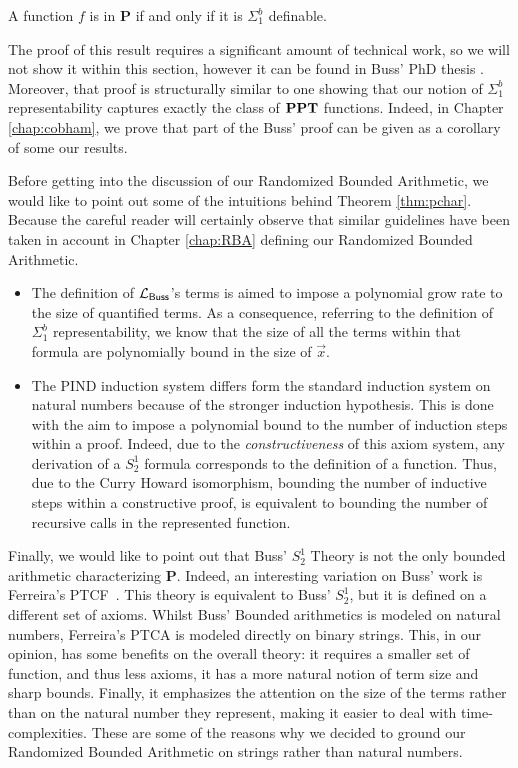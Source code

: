 \begin{theorem}
  \label{thm:pchar}
  A function $f$ is in $\mathbf P$ if and only if it is $\Sigma^b_1$ definable.
\end{theorem}

The proof of this result requires a significant amount of technical work, so we will not show it within this section, however it can be found in Buss' PhD thesis \cite{Buss86}. Moreover, that proof is structurally similar to one showing that our notion of $\Sigma^b_1$ representability captures exactly the class of $\mathbf{PPT}$ functions. Indeed, in Chapter \ref{chap:cobham}, we prove that part of the Buss' proof can be given as a corollary of some our results.

Before getting into the discussion of our Randomized Bounded
Arithmetic, we would like to point out some of the intuitions behind
Theorem \ref{thm:pchar}. Because the careful reader will certainly observe that
similar guidelines have been taken in account in Chapter \ref{chap:RBA} defining
our Randomized Bounded Arithmetic.

\begin{itemize}
  \item The definition of $\mathcal{L}_{\mathsf{Buss}}$'s terms is aimed to impose a polynomial grow rate to the size of quantified terms. As a consequence, referring to the definition of $\Sigma^b_1$ representability, we know that the size of all the terms within that formula are polynomially bound in the size of $\vec x$.
  \item The PIND induction system differs form the standard induction system on natural numbers because of the stronger induction hypothesis. This is done with the aim to impose a polynomial bound to the number of induction steps within a proof.
  Indeed, due to the \emph{constructiveness} of this axiom system,
  any derivation of a $S^1_2$ formula corresponds to
  the definition of a function. Thus, due to the Curry Howard isomorphism, bounding the number of inductive steps within a constructive proof, is equivalent to bounding the number of recursive calls in the represented function.
\end{itemize}



Finally, we would like to point out that Buss' $S^1_2$ Theory is not the only bounded arithmetic characterizing $\mathbf P$. Indeed, an interesting variation on Buss' work is Ferreira's PTCF~\cite{Ferreira88}. This theory is equivalent to Buss' $S^1_2$, but it is defined on a different set of axioms. Whilst Buss' Bounded arithmetics is modeled on natural numbers, Ferreira's PTCA is modeled directly on binary strings. This, in our opinion, has some benefits on the overall theory: it requires a smaller set of function, and thus less axioms, it has a more natural notion of term size and sharp bounds. Finally, it emphasizes the attention on the size of the terms rather than on the natural number they represent, making it easier to deal with time-complexities.
%
These are some of the reasons why we decided to ground our Randomized Bounded Arithmetic on strings rather than natural numbers.
